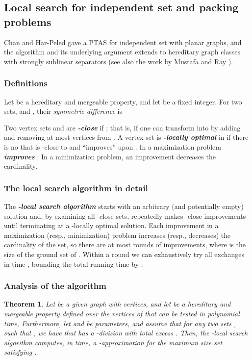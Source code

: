 \documentclass[12pt]{article}
\newcommand{\Term}[1]{\textsf{#1}}
\newcommand{\emphic}[2]{\textcolor{blue25}{\textbf{\emph{#1}}}\index{#2}}
\renewcommand{\emphic}[2]{\textbf{\emph{#1}}}
\newcommand{\emphi}[1]{\emphic{#1}{#1}}
\newtheorem{theorem}{Theorem}\newtheorem{lemma}[theorem]{Lemma}\newtheorem*{restate*}[theorem]{Restatement of }\newtheorem{corollary}[theorem]{Corollary}
\theoremstyle{remark}\theoremheaderfont{\sf}\theorembodyfont{\upshape}
\numberwithin{figure}{section}\numberwithin{table}{section}\numberwithin{equation}{section}
\newcommand{\HLink}[2]{\hyperref[#2]{#1~\ref*{#2}}}
\newcommand{\HLinkPage}[2]{\hyperref[#2]{#1~\ref*{#2}}}
\newcommand{\seclab}[1]{\label{sec:#1}} \newcommand{\secref}[1]{\HLink{Section}{sec:#1}} \newcommand{\secrefpage}[1]{\HLinkPage{Section}{sec:#1}}
\newcommand{\thmlab}[1]{{\label{theo:#1}}}
\newcommand{\PTAS}{\Term{PTAS}\xspace}
\begin{document}
\subsection{Local search for independent set and packing problems}

Chan and Har-Peled \cite{ch-aamis-12} gave a \PTAS for independent set
with planar graphs, and the algorithm and its underlying argument
extends to hereditary graph classes with strongly sublinear separators
(see also the work by Mustafa and Ray \cite{mr-irghs-10}).


\subsubsection{Definitions}

Let  be a hereditary and mergeable property, and let 
be a fixed integer.  For two sets,  and , their
\emph{symmetric difference} is

Two vertex sets  and  are \emphi{-close} if
; that is, if one can
transform  into  by adding and removing at most
 vertices from . A vertex set  is
\emphi{-locally optimal} in  if there is no
 that is -close to  and ``improves''
upon . In a maximization problem  \emphi{improves}
  . In a minimization
problem, an improvement decreases the cardinality.


\subsubsection{The local search algorithm in detail}
\seclab{l:s:alg}


The \emphi{-local search algorithm} starts with an
arbitrary (and potentially empty) solution  and, by
examining all -close sets, repeatedly makes -close
improvements until terminating at a -locally optimal
solution. Each improvement in a maximization (resp., minimization)
problem increases (resp., decreases) the cardinality of the set, so
there are at most  rounds of improvements, where  is the size of
the ground set of . Within a round we can exhaustively try all
exchanges in time , bounding the total running time by
.

\subsubsection{Analysis of the algorithm}

\begin{theorem}
  \thmlab{independent}Let  be a given graph with  vertices, and let 
  be a hereditary and mergeable property defined over the vertices of
   that can be tested in polynomial time, Furthermore, let
   and  be parameters, and assume that for any two
  sets , such that
  , we have that 
  has a -division with total excess
  .  Then, the -local search
  algorithm computes, in  time, a
  -approximation for the maximum size set
   satisfying .
\end{theorem}
\end{document}
